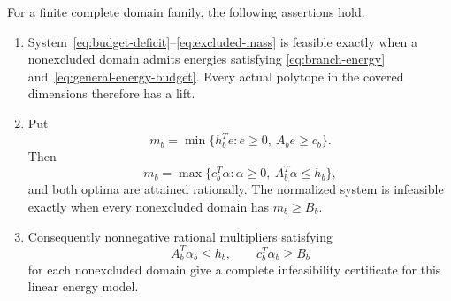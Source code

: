 \begin{theorem}
\label{thm:budget-lift}\label{prop:general-energy-budget}
\label{thm:energy-normalization}\label{thm:energy-certificate}
\label{prop:capacity-complete}
For a finite complete domain family, the following assertions hold.
\begin{enumerate}[label=\textup{(\roman*)}]
\item System~\eqref{eq:budget-deficit}--\eqref{eq:excluded-mass} is
feasible exactly when a nonexcluded domain admits energies satisfying
\eqref{eq:branch-energy} and~\eqref{eq:general-energy-budget}.
Every actual polytope in the covered dimensions therefore has a lift.
\item Put
\begin{equation}\label{eq:branch-minimum}
 m_b=\min\{h_b^Te:e\ge0,\ A_be\ge c_b\}.
\end{equation}
Then
\begin{equation}\label{eq:branch-duality}
 m_b=\max\{c_b^T\alpha:\alpha\ge0,\ A_b^T\alpha\le h_b\},
\end{equation}
and both optima are attained rationally. The normalized system is
infeasible exactly when every
nonexcluded domain has $m_b\ge B_b$.
\item Consequently nonnegative rational multipliers satisfying
\begin{equation}\label{eq:general-capacity-certificate}
               A_b^T\alpha_b\le h_b,\qquad
               c_b^T\alpha_b\ge B_b
\end{equation}
for each nonexcluded domain give a complete infeasibility certificate
for this linear energy model.
\end{enumerate}
\end{theorem}
